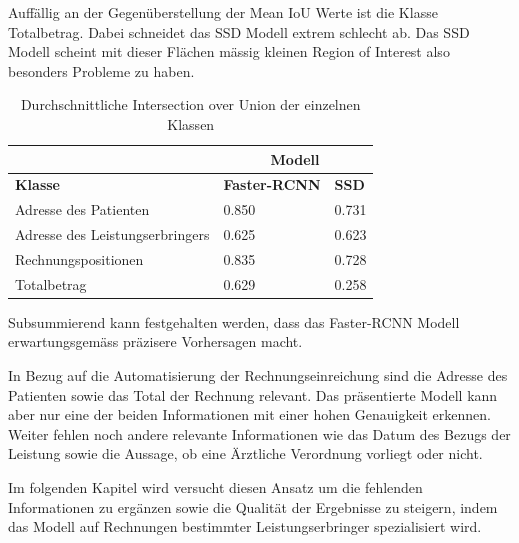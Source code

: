 Auffällig an der Gegenüberstellung der Mean IoU Werte ist die Klasse Totalbetrag. Dabei schneidet das SSD Modell extrem schlecht ab. Das SSD Modell scheint mit dieser Flächen mässig kleinen Region of Interest also besonders Probleme zu haben.

\begin{table}[h!]
    \centering
    \captionsetup{width=.9\linewidth}
    \caption{Durchschnittliche Intersection over Union der einzelnen Klassen}
    \label{tab:3ap-iou}
    \begin{tabular}{|l|l|l|}
    \hhline{~|--|}    
    \multicolumn{1}{c|}{}
                                    & \multicolumn{2}{c|}{\cellcolor[HTML]{DDDDDD}\textbf{Modell}}  \\
    \hline
    \rowcolor[HTML]{DDDDDD}
    \textbf{Klasse}                          & \textbf{Faster-RCNN} & \textbf{SSD}           \\
    \hline
    Adresse des Patienten           & 0.850       & 0.731         \\
    \hline
    Adresse des Leistungserbringers & 0.625       & 0.623         \\
    \hline
    Rechnungspositionen             & 0.835       & 0.728         \\
    \hline
    Totalbetrag                     & 0.629       & 0.258         \\  
    \hline
    \end{tabular}
\end{table}

Subsummierend kann festgehalten werden, dass das Faster-RCNN Modell erwartungsgemäss präzisere Vorhersagen macht. 

In Bezug auf die Automatisierung der Rechnungseinreichung sind die Adresse des Patienten sowie das Total der Rechnung relevant. Das präsentierte Modell kann aber nur eine der beiden Informationen mit einer hohen Genauigkeit erkennen. Weiter fehlen noch andere relevante Informationen wie das Datum des Bezugs der Leistung sowie die Aussage, ob eine Ärztliche Verordnung vorliegt oder nicht. 

Im folgenden Kapitel wird versucht diesen Ansatz um die fehlenden Informationen zu ergänzen sowie die Qualität der Ergebnisse zu steigern, indem das Modell auf Rechnungen bestimmter Leistungserbringer spezialisiert wird.


